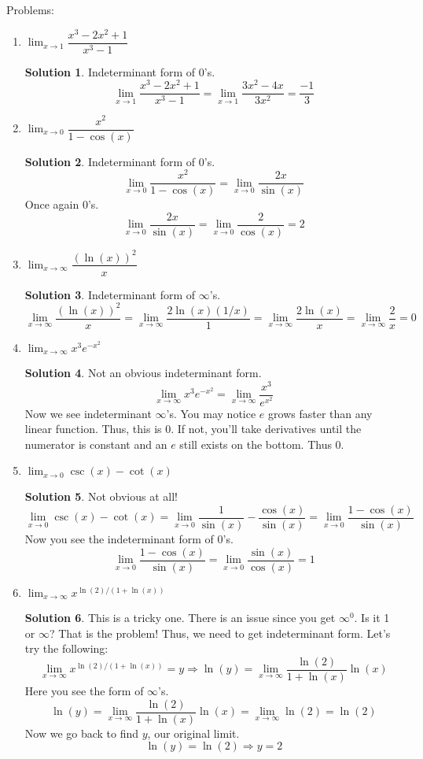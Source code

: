 \documentclass[10pt]{article}
\newcommand{\ds}{\displaystyle}
\theoremstyle{Theorem}
\theoremstyle{definition}
\newtheorem*{solution}{Solution}
\theoremstyle{remark}
\theoremstyle{custom}
\begin{document}
\newpage
\noindent Problems:\\
\begin{enumerate}[1.]
\item $\ds \lim_{x\rightarrow 1}\dfrac{x^3-2x^2+1}{x^3-1}$
\begin{solution}
Indeterminant form of 0's. 
\[
\lim_{x\rightarrow 1}\dfrac{x^3-2x^2+1}{x^3-1}=\lim_{x\rightarrow 1}\dfrac{3x^2-4x}{3x^2}=\dfrac{-1}{3}
\]
\end{solution}
\item $\ds \lim_{x\rightarrow 0}\dfrac{x^2}{1-\cos(x)}$
\begin{solution}
Indeterminant form of 0's. 
\[
\lim_{x\rightarrow 0}\dfrac{x^2}{1-\cos(x)}=\lim_{x\rightarrow 0} \dfrac{2x}{\sin(x)}
\]
Once again 0's. 
\[
\lim_{x\rightarrow 0} \dfrac{2x}{\sin(x)}=\lim_{x\rightarrow 0}\dfrac{2}{\cos(x)}=2
\]
\end{solution}
\item $\ds \lim_{x\rightarrow \infty}\dfrac{(\ln(x))^2}{x}$
\begin{solution}
Indeterminant form of $\infty$'s.
\[
\lim_{x\rightarrow \infty}\dfrac{(\ln(x))^2}{x}=\lim_{x\rightarrow \infty} \dfrac{2\ln(x)(1/x)}{1}=\lim_{x\rightarrow \infty} \dfrac{2\ln(x)}{x}=\lim_{x\rightarrow \infty} \dfrac{2}{x}=0
\]
\end{solution}
\item $\ds \lim_{x\rightarrow \infty} x^3e^{-x^2}$
\begin{solution}
Not an obvious indeterminant form. 
\[
 \lim_{x\rightarrow \infty} x^3e^{-x^2}=\lim_{x\rightarrow \infty}\dfrac{x^3}{e^{x^2}}
\]
Now we see indeterminant $\infty$'s. You may notice $e$ grows faster than any linear function. Thus, this is 0. If not, you'll take derivatives until the numerator is constant and an $e$ still exists on the bottom. Thus 0.
\end{solution}
\item $\ds \lim_{x\rightarrow 0}\csc(x)-\cot(x)$
\begin{solution}
Not obvious at all! 
\[
\lim_{x\rightarrow 0}\csc(x)-\cot(x)=\lim_{x\rightarrow 0} \dfrac{1}{\sin(x)}-\dfrac{\cos(x)}{\sin(x)}=\lim_{x\rightarrow 0} \dfrac{1-\cos(x)}{\sin(x)}
\]
Now you see the indeterminant form of 0's.
\[
\lim_{x\rightarrow 0} \dfrac{1-\cos(x)}{\sin(x)}=\lim_{x\rightarrow 0}\dfrac{\sin(x)}{\cos(x)}=1
\]
\end{solution}
\item $\ds \lim_{x\rightarrow \infty} x^{\ln(2)/(1+\ln(x))}$
\begin{solution}
This is a tricky one. There is an issue since you get $\infty^0$. Is it 1 or $\infty$? That is the problem! Thus, we need to get indeterminant form. Let's try the following:
\[
 \lim_{x\rightarrow \infty} x^{\ln(2)/(1+\ln(x))}=y \Rightarrow \ln(y)=\lim_{x\rightarrow \infty}\dfrac{\ln(2)}{1+\ln(x)}\ln(x)
 \]
 Here you see the form of $\infty$'s.
 \[
\ln(y)= \lim_{x\rightarrow \infty}\dfrac{\ln(2)}{1+\ln(x)}\ln(x)= \lim_{x\rightarrow \infty}\ln(2)=\ln(2)
 \]
 Now we go back to find $y$, our original limit. 
 \[
 \ln(y)=\ln(2) \Rightarrow y=2
 \]
\end{solution}
\end{enumerate}
\end{document}
